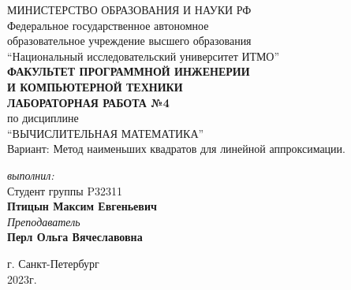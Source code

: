 \begin{center}
	МИНИСТЕРСТВО ОБРАЗОВАНИЯ И НАУКИ РФ\\
	\hfill \break
	Федеральное государственное автономное\\
	образовательное учреждение высшего образования\\
	``Национальный исследовательский университет ИТМО''\\
	\hfill \break
	\textbf{ФАКУЛЬТЕТ ПРОГРАММНОЙ ИНЖЕНЕРИИ \\
	И КОМПЬЮТЕРНОЙ ТЕХНИКИ}\\
	\vspace{2cm}
	\large{\textbf{ЛАБОРАТОРНАЯ РАБОТА №4}}\\
	\hfill \break
	по дисциплине\\
		\large{``ВЫЧИСЛИТЕЛЬНАЯ МАТЕМАТИКА''}\\
	\hfill \break
	Вариант: Метод наименьших квадратов для линейной аппроксимации. \\
	\vspace{5cm}
	\begin{flushright}
	\textit{выполнил:}\\
	Студент группы P32311\\
	\textbf{Птицын Максим Евгеньевич}\\
	\textit{Преподаватель}\\
	\textbf{Перл Ольга Вячеславовна}
	\end{flushright}
\end{center}

\vfill

\begin{center}
	г. Санкт-Петербург\\2023г.
\end{center}
\thispagestyle{empty}
\newpage